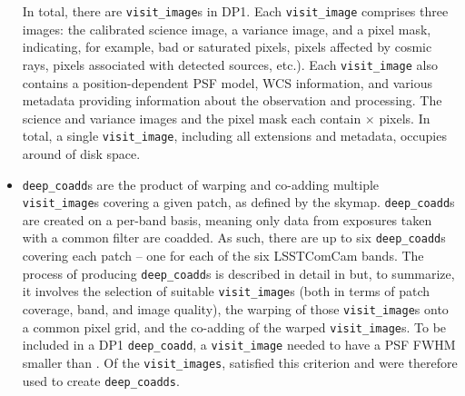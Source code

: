\begin{itemize}
In total, there are \nvisitimages \texttt{visit\_image}s in \gls{DP1}.
Each \texttt{visit\_image}  comprises three images: the calibrated science image, a variance image, and a pixel mask, indicating, for example, bad or saturated pixels, pixels affected by cosmic rays, pixels associated with detected sources, etc.).
Each \texttt{visit\_image} also contains a position-dependent \gls{PSF} model, \gls{WCS} information, and various \gls{metadata} providing information about the observation and processing.
The science and variance images and the pixel mask each contain \nvisitimagepixx$\times$ \nvisitimagepixy pixels.
In total, a single \texttt{visit\_image}, including all extensions and \gls{metadata}, occupies around \visitimagehdd of disk space.





\item \texttt{deep\_coadd}s are the product of warping and co-adding multiple \texttt{visit\_image}s covering a given \gls{patch}, as defined by the skymap.
\texttt{deep\_coadd}s are created on a per-band basis, meaning only data from exposures taken with a common filter are coadded.
As such, there are up to six \texttt{deep\_coadd}s covering each \gls{patch} -- one for each of the six \gls{LSSTComCam} bands.
The process of producing \texttt{deep\_coadd}s is described in detail in  but, to summarize, it involves the selection of suitable \texttt{visit\_image}s (both in terms of \gls{patch} coverage, band, and image quality), the warping of those \texttt{visit\_image}s onto a common pixel grid, and the co-adding of the warped \texttt{visit\_image}s.
To be included in a \gls{DP1} \texttt{deep\_coadd}, a \texttt{visit\_image} needed to have a \gls{PSF} \gls{FWHM} smaller than \deepcoaddmaxfwhm. Of the \nvisitimages \texttt{visit\_images}, \nselectedvisitimages satisfied this criterion and were therefore used to create \texttt{deep\_coadds}.


\end{itemize}
